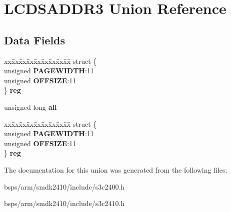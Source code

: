 \hypertarget{unionLCDSADDR3}{}\section{L\+C\+D\+S\+A\+D\+D\+R3 Union Reference}
\label{unionLCDSADDR3}
\subsection*{Data Fields}
\begin{DoxyCompactItemize}
\item 
\mbox{\label{unionLCDSADDR3_afa47b39159cec080848904a4410e7b68}} 
\begin{tabbing}
xx\=xx\=xx\=xx\=xx\=xx\=xx\=xx\=xx\=\kill
struct \{\\
\>unsigned {\bfseries PAGEWIDTH}:11\\
\>unsigned {\bfseries OFFSIZE}:11\\
\} {\bfseries reg}\\

\end{tabbing}\item 
\mbox{\label{unionLCDSADDR3_ac7653b87e99f5b1d2f4fb3f8f397b668}} 
unsigned long {\bfseries all}
\item 
\mbox{\label{unionLCDSADDR3_a7fb1b98809552eecca5ba3dc1ca38ed8}} 
\begin{tabbing}
xx\=xx\=xx\=xx\=xx\=xx\=xx\=xx\=xx\=\kill
struct \{\\
\>unsigned {\bfseries PAGEWIDTH}:11\\
\>unsigned {\bfseries OFFSIZE}:11\\
\} {\bfseries reg}\\

\end{tabbing}\end{DoxyCompactItemize}


The documentation for this union was generated from the following files\+:\begin{DoxyCompactItemize}
\item 
bsps/arm/smdk2410/include/s3c2400.\+h\item 
bsps/arm/smdk2410/include/s3c2410.\+h\end{DoxyCompactItemize}

